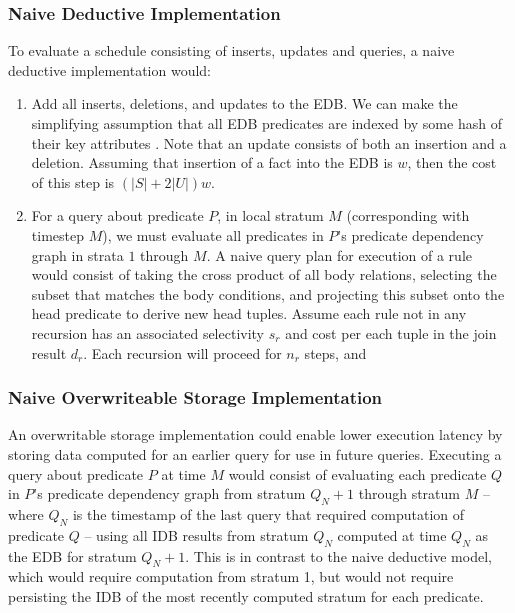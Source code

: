 \subsubsection{Naive Deductive Implementation}

To evaluate a schedule consisting of inserts, updates and queries, a naive deductive implementation would:

\begin{enumerate}

\item Add all inserts, deletions, and updates to the EDB.  We can make
the simplifying assumption that all EDB predicates are indexed by some hash of
their key attributes .  Note that
an update consists of both an insertion and a deletion.  Assuming that
insertion of a fact into the EDB is $w$, then the cost of this
step is $(|S|+2|U|)w$.

\item For a query about predicate $P$, in local stratum $M$ (corresponding with
timestep $M$), we must evaluate all predicates in $P$'s predicate dependency
graph in strata $1$ through $M$.  
A naive query plan for execution of a rule would consist of taking the cross
product of all body relations, selecting the subset that matches the body
conditions, and projecting this subset onto the head predicate to derive new
head tuples.  Assume each rule not in any recursion has an associated
selectivity $s_r$ and cost per each tuple in the join result $d_r$.  Each
recursion will proceed for $n_r$ steps, and 



\end{enumerate}


\subsubsection{Naive Overwriteable Storage Implementation}

An overwritable storage implementation could enable lower execution latency by
storing data computed for an earlier query for use in future queries.
Executing a query about predicate $P$ at time $M$ would consist of evaluating
each predicate $Q$ in $P$'s predicate dependency graph from stratum $Q_N+1$
through stratum $M$ -- where $Q_N$ is the timestamp of the last query that
required computation of predicate $Q$ -- using all IDB results from stratum
$Q_N$ computed at time $Q_N$ as the EDB for stratum $Q_N+1$.    This is in contrast to the naive deductive model, which would
require computation from stratum 1, but would not require persisting the IDB 
of the most recently computed stratum for each predicate. 


